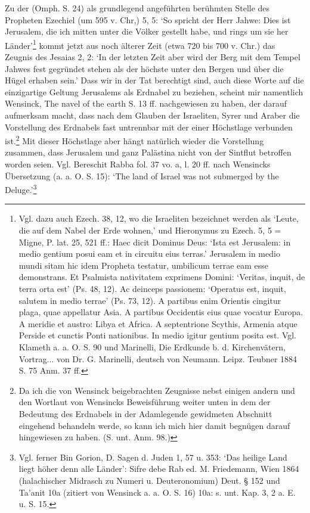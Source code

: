 \documentclass[a4paper, 11pt, oneside]{article}
\begin{document}
Zu der (Omph. S. 24) als grundlegend angeführten berühmten Stelle des Propheten Ezechiel (um 595 v. Chr,) 5, 5: `So spricht der Herr Jahwe: Dies ist Jerusalem, die ich mitten unter die Völker gestellt habe, und rings um sie her Länder'\footnote{Vgl. dazu auch Ezech. 38, 12, wo die Israeliten bezeichnet werden als `Leute, die auf dem Nabel der Erde wohnen,' und Hieronymus zu Ezech. 5, 5 = Migne, P. lat. 25, 521 ff.: Haec dicit Dominus Deus: `Ista est Jerusalem: in medio gentium posui eam et in circuitu eius terras.' Jerusalem in medio mundi sitam hic idem Propheta testatur, umbilicum terrae eam esse demonstrans. Et Psalmista nativitatem exprimens Domini: `Veritas, inquit, de terra orta est' (Ps. 48, 12). Ac deinceps passionem: `Operatus est, inquit, salutem in medio terrae' (Ps. 73, 12). A partibus enim Orientis cingitur plaga, quae appellatur Asia. A partibus Occidentis eius quae vocatur Europa. A meridie et austro: Libya et Africa. A septentrione Scythis, Armenia atque Perside et cunctis Ponti nationibus. In medio igitur gentium posita est. Vgl. Klameth a. a. O. S. 90 und Marinelli, Die Erdkunde b. d. Kirchenvätern, Vortrag... von Dr. G. Marinelli, deutsch von Neumann. Leipz. Teubner 1884 S. 75 Anm. 37 ff.} kommt jetzt aus noch älterer Zeit (etwa 720 bis 700 v. Chr.) das Zeugnis des Jesaias 2, 2: `In der letzten Zeit aber wird der Berg mit dem Tempel Jahwes fest gegründet stehen als der höchste unter den Bergen und über die Hügel erhaben sein.' Dass wir in der Tat berechtigt sind, auch diese Worte auf die einzigartige Geltung Jerusalems als Erdnabel zu beziehen, scheint mir namentlich Wensinck, The navel of the earth S. 13 ff. nachgewiesen zu haben, der darauf aufmerksam macht, dass nach dem Glauben der Israeliten, Syrer und Araber die Vorstellung des Erdnabels fast untrennbar mit der einer Höchstlage verbunden ist.\footnote{Da ich die von Wensinck beigebrachten Zeugnisse nebst einigen andern und den Wortlaut von Wensincks Beweisführung weiter unten in dem der Bedeutung des Erdnabels in der Adamlegende gewidmeten Abschnitt eingehend behandeln werde, so kann ich mich hier damit begnügen darauf hingewiesen zu haben. (S. unt. Anm. 98.)} Mit dieser Höchstlage aber hängt natürlich wieder die Vorstellung zusammen, dass Jerusalem und ganz Palästina nicht von der Sintflut betroffen worden seien. Vgl. Bereschit Rabba fol. 37 vo. a, l. 20 ff. nach Wensincks Übersetzung (a. a. O. S. 15): `The land of Israel was not submerged by the Deluge.'\footnote{Vgl. ferner Bin Gorion, D. Sagen d. Juden 1, 57 u. 353: `Das heilige Land liegt höher denn alle Länder': Sifre debe Rab ed. M. Friedemann, Wien 1864 (halachischer Midrasch zu Numeri u. Deuteronomium) Deut. § 152 und Ta'anit 10a (zitiert von Wensinck a. a. O. S. 16) 10a: s. unt. Kap. 3, 2 a. E. u. S. 15.}
\end{document}
